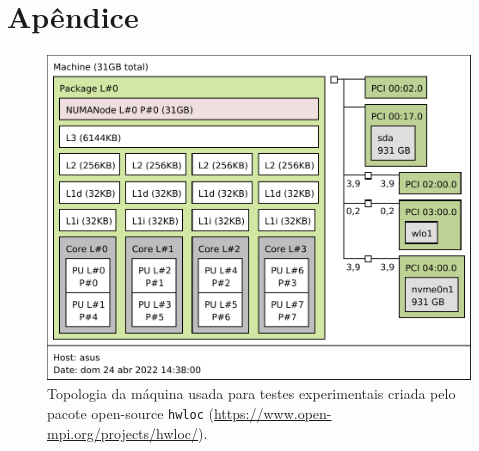 \documentclass[a4,12pt]{horizon-theme}
\begin{document}
\vspace{10mm}

\section*{Apêndice}
\appendix

\begin{figure}[!ht]
  \centering
  \includegraphics[width=\textwidth]{../topology.pdf}
  \caption{Topologia da máquina usada para testes experimentais criada pelo pacote open-source \texttt{hwloc} (\url{https://www.open-mpi.org/projects/hwloc/}).}
  \label{fig:topologia}
\end{figure}

\newpage




\horizonBackCover
\end{document}

